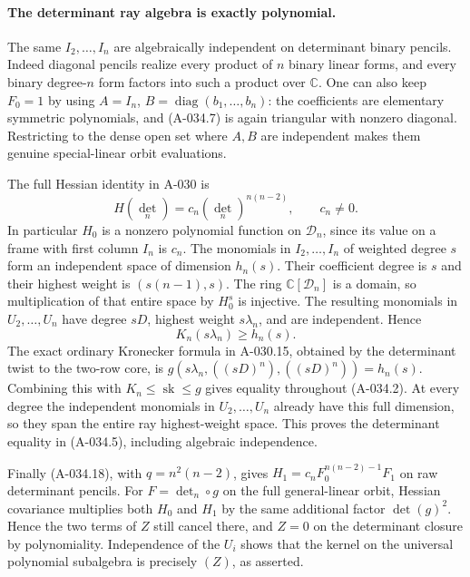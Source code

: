 \paragraph{The determinant ray algebra is exactly polynomial.}
The same \(I_2,\ldots,I_n\) are algebraically independent
on determinant binary pencils. Indeed diagonal pencils
realize every product of \(n\) binary linear forms, and
every binary degree-\(n\) form factors into such a product
over \(\mathbb C\). One can also keep \(F_0=1\) by
using \(A=I_n\), \(B=\operatorname{diag}(b_1,\ldots,b_n)\):
the coefficients are elementary symmetric polynomials,
and (A-034.7) is again triangular with nonzero diagonal.
Restricting to the dense open set where \(A,B\) are
independent makes them genuine special-linear orbit
evaluations.

The full Hessian identity in A-030 is
\[
 H(\det_n)=c_n(\det_n)^{n(n-2)},\qquad c_n\ne0.
                                                               \tag{A-034.18}
\]
In particular \(H_0\) is a nonzero polynomial function
on \(\mathcal D_n\), since its value on a frame with
first column \(I_n\) is \(c_n\).
The monomials in \(I_2,\ldots,I_n\) of weighted degree
\(s\) form an independent space of dimension \(h_n(s)\).
Their coefficient degree is \(s\) and their highest
weight is \((s(n-1),s)\).
The ring \(\mathbb C[\mathcal D_n]\) is a domain, so
multiplication of that entire space by \(H_0^s\) is
injective. The resulting monomials in \(U_2,\ldots,U_n\)
have degree \(sD\), highest weight \(s\lambda_n\), and
are independent. Hence
\[
                         K_n(s\lambda_n)\geq h_n(s).
                                                               \tag{A-034.19}
\]
The exact ordinary Kronecker formula in A-030.15,
obtained by the determinant twist to the two-row core,
is \(g(s\lambda_n,((sD)^n),((sD)^n))=h_n(s)\).
Combining this with \(K_n\leq\operatorname{sk}\leq g\)
gives equality throughout (A-034.2).
At every degree the independent monomials in
\(U_2,\ldots,U_n\) already have this full dimension,
so they span the entire ray highest-weight space.
This proves the determinant equality in (A-034.5),
including algebraic independence.

Finally (A-034.18), with \(q=n^2(n-2)\), gives
\(H_1=c_n F_0^{n(n-2)-1}F_1\) on raw determinant
pencils. For \(F=\det_n\circ g\) on the full
general-linear orbit, Hessian covariance multiplies
both \(H_0\) and \(H_1\) by the same additional
factor \(\det(g)^2\). Hence the two terms of \(Z\)
still cancel there, and \(Z=0\) on the determinant
closure by polynomiality. Independence of the \(U_i\)
shows that the kernel on the universal polynomial
subalgebra is precisely \((Z)\), as asserted.

